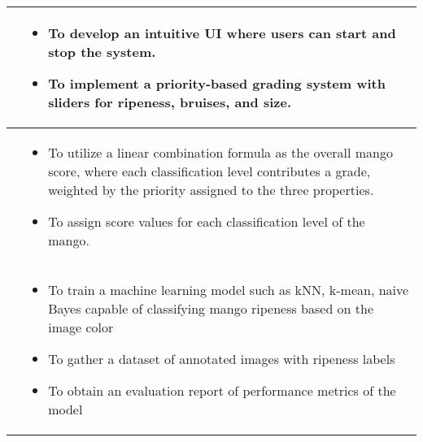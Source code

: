 \begin{table}[!htbp]
{\begin{tabular}{p{}|p{}}
			\Paste{SO3} & 
			\begin{minipage}{0.55\textwidth}
				\vspace{10pt}
				\begin{itemize}
					\item To develop an intuitive UI where users can start and stop the system.
					\item To implement a priority-based grading system with sliders for ripeness, bruises, and size.
				\end{itemize}
			\end{minipage} \\ \hline
						
			\Paste{SO4} & 
			\begin{minipage}{0.55\textwidth}
				\vspace{10pt}
				\begin{itemize}
					\item To utilize a linear combination formula as the overall mango score, where each classification level 
					contributes a grade, weighted by the priority assigned to the three properties.
					\item To assign score values for each classification level of the mango.
				\end{itemize}
			\end{minipage} \\ \hline
		

			\Paste{SO5} & 
			\begin{minipage}{0.55\textwidth}
				\vspace{10pt}
				\begin{itemize}
					\item To train a machine learning model such as kNN, k-mean, naive Bayes capable
					of classifying mango ripeness based on the image color
					\item To gather a dataset of annotated images with ripeness labels
					\item To obtain an evaluation report of performance metrics of the model
				\end{itemize}
			\end{minipage} \\ \hline

			
		\end{tabular}	
			
	}
\end{table}


